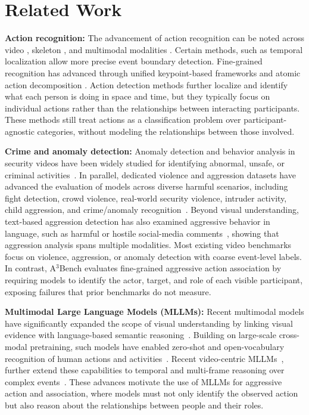 \section{Related Work}
\noindent\textbf{Action recognition:}
The advancement of action recognition can be noted across video \cite{VideoMAE, ActionDetailLAQ}, skeleton \cite{FreqSemSkeleton, CrossModalSkeleton, skeletoncontext}, and multimodal modalities \cite{vificlip, actionclip, xclip, froster, t2l, AudioVisualLearning}. Certain methods, such as temporal localization \cite{TriDet, Stepwise, PseudoFormer} allow more precise event boundary detection. Fine-grained recognition has advanced through unified keypoint-based frameworks \cite{Keypoint} and atomic action decomposition \cite{Atomic}. Action detection methods further localize and identify what each person is doing in space and time, but they typically focus on individual actions rather than the relationships between interacting participants. These methods still treat actions as a classification problem over participant-agnostic categories, without modeling the relationships between those involved.

\noindent\textbf{Crime and anomaly detection:}
Anomaly detection and behavior analysis in security videos have been widely studied for identifying abnormal, unsafe, or criminal activities~\cite{OSAR,surveillancevqa}. In parallel, dedicated violence and aggression datasets have advanced the evaluation of models across diverse harmful scenarios, including fight detection, crowd violence, real-world security violence, intruder activity, child aggression, and crime/anomaly recognition~\cite{moviesfight,dvd,rlvs,violentflows,rwf,vid,iard,xdviolence,cabad,crxk,ucfcrimes}. Beyond visual understanding, text-based aggression detection has also examined aggressive behavior in language, such as harmful or hostile social-media comments~\cite{AggressiveComments}, showing that aggression analysis spans multiple modalities. Most existing video benchmarks focus on violence, aggression, or anomaly detection with coarse event-level labels. In contrast, A$^3$Bench evaluates fine-grained aggressive action association by requiring models to identify the actor, target, and role of each visible participant, exposing failures that prior benchmarks do not measure.

\noindent\textbf{Multimodal Large Language Models (MLLMs):}
Recent multimodal models have significantly expanded the scope of visual understanding by linking visual evidence with language-based semantic reasoning~\cite{clip}. Building on large-scale cross-modal pretraining, such models have enabled zero-shot and open-vocabulary recognition of human actions and activities~\cite{VLM-WACV25,actionclip,xclip,vificlip,froster,t2l}. Recent video-centric MLLMs~\cite{qwen3vl,internvl3,ovis2_5,gemma4}, further extend these capabilities to temporal and multi-frame reasoning over complex events~\cite{VideoGPT,SeViLA,LVR}. These advances motivate the use of MLLMs for aggressive action and association, where models must not only identify the observed action but also reason about the relationships between people and their roles.


